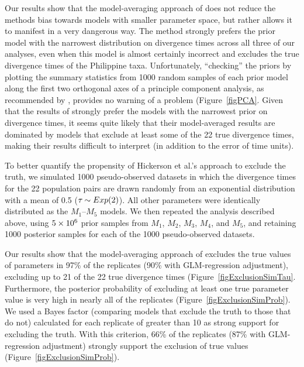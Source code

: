 \documentclass[letterpaper,12pt]{article}
\begin{document}
\begin{linenumbers}
Our results show that the model-averaging approach of \citet{Hickerson2013}
does not reduce the methods bias towards models with smaller parameter space,
but rather allows it to manifest in a very dangerous way.
The method strongly prefers the prior model with the narrowest distribution on
divergence times across all three of our analyses, even when this model is
almost certainly incorrect and excludes the true divergence times of the
Philippine taxa.
Unfortunately, ``checking'' the priors by plotting the summary statistics from
1000 random samples of each prior model along the first two orthogonal axes of
a principle component analysis, as recommended by \citet{Hickerson2013},
provides no warning of a problem (Figure~\ref{figPCA}.
Given that the results of \citet{Hickerson2013} strongly prefer the models with
the narrowest prior on divergence times, it seems quite likely that their
model-averaged results are dominated by models that exclude at least some of
the 22 true divergence times, making their results difficult to interpret
(in addition to the error of time units).

To better quantify the propensity of Hickerson et al.'s
\citeyear{Hickerson2013} approach to exclude the truth, we simulated
1000 pseudo-observed datasets in which the divergence times for the
22 population pairs are drawn randomly from an exponential distribution
with a mean of 0.5 ($\tau_{} \sim Exp(2)$). All other parameters were
identically distributed as the $M_1$--$M_5$ models.
We then repeated the analysis described above, using $5\times 10^{6}$ prior samples from
$M_1$, $M_2$, $M_3$, $M_4$, and $M_5$, and retaining 1000 posterior samples
for each of the 1000 pseudo-observed datasets.

Our results show that the model-averaging approach of \citet{Hickerson2013}
excludes the true values of parameters in 97\% of the replicates (90\% with
GLM-regression adjustment), excluding up to 21 of the 22 true divergence times
(Figure~\ref{figExclusionSimTau}.
Furthermore, the posterior probability of excluding at least one true parameter
value is very high in nearly all of the replicates
(Figure~\ref{figExclusionSimProb}).
We used a Bayes factor (comparing models that exclude the truth to those that
do not) calculated for each replicate of greater than 10 as strong support for
excluding the truth.
With this criterion, 66\% of the replicates (87\% with GLM-regression adjustment)
strongly support the exclusion of true values (Figure~\ref{figExclusionSimProb}).


\end{linenumbers}
\end{document}
